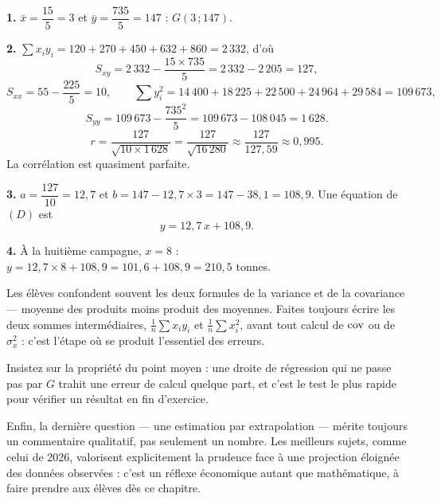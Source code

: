 \begin{corrige}
\textbf{1.} $\overline{x} = \dfrac{15}{5} = 3$ et
$\overline{y} = \dfrac{735}{5} = 147$ : $G(3\,;147)$.

\textbf{2.} $\sum x_{i}y_{i} = 120+270+450+632+860 = 2\,332$, d'où
\[
  S_{xy} = 2\,332-\frac{15 \times 735}{5} = 2\,332-2\,205 = 127,
\]
\[
  S_{xx} = 55-\frac{225}{5} = 10, \qquad
  \sum y_{i}^{2} = 14\,400+18\,225+22\,500+24\,964+29\,584 = 109\,673,
\]
\[
  S_{yy} = 109\,673-\frac{735^{2}}{5} = 109\,673-108\,045 = 1\,628 .
\]
\[
  r = \frac{127}{\sqrt{10 \times 1\,628}} = \frac{127}{\sqrt{16\,280}}
  \approx \frac{127}{127{,}59} \approx 0{,}995 .
\]
La corrélation est quasiment parfaite.

\textbf{3.} $a = \dfrac{127}{10} = 12{,}7$ et
$b = 147-12{,}7 \times 3 = 147-38{,}1 = 108{,}9$. Une équation de $(D)$ est
\[
  y = 12{,}7\,x+108{,}9 .
\]

\textbf{4.} À la huitième campagne, $x = 8$ :
$y = 12{,}7 \times 8+108{,}9 = 101{,}6+108{,}9 = 210{,}5$ tonnes.
\end{corrige}

\begin{notepourlaclasse}
Les élèves confondent souvent les deux formules de la variance et de la
covariance — moyenne des produits moins produit des moyennes. Faites
toujours écrire les deux sommes intermédiaires,
$\frac1n\sum x_{i}y_{i}$ et $\frac1n\sum x_{i}^{2}$, avant tout calcul de
$\operatorname{cov}$ ou de $\sigma_{x}^{2}$ : c'est l'étape où se produit l'essentiel des
erreurs.

Insistez sur la propriété du point moyen : une droite de régression qui ne
passe pas par $G$ trahit une erreur de calcul quelque part, et c'est le test
le plus rapide pour vérifier un résultat en fin d'exercice.

Enfin, la dernière question — une estimation par extrapolation — mérite
toujours un commentaire qualitatif, pas seulement un nombre. Les meilleurs
sujets, comme celui de 2026, valorisent explicitement la prudence face à une
projection éloignée des données observées : c'est un réflexe économique
autant que mathématique, à faire prendre aux élèves dès ce chapitre.
\end{notepourlaclasse}
